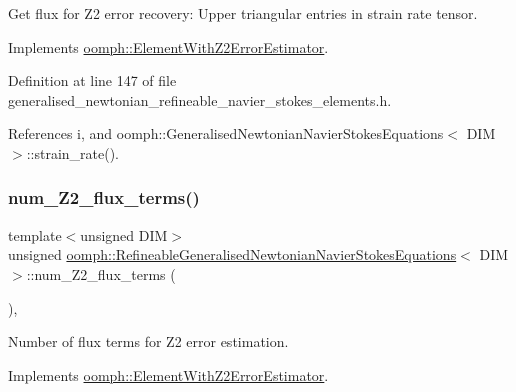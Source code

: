 Get \textquotesingle{}flux\textquotesingle{} for Z2 error recovery\+: Upper triangular entries in strain rate tensor. 



Implements \hyperlink{classoomph_1_1ElementWithZ2ErrorEstimator_a5688ff5f546d81771cabad82ca5a7556}{oomph\+::\+Element\+With\+Z2\+Error\+Estimator}.



Definition at line 147 of file generalised\+\_\+newtonian\+\_\+refineable\+\_\+navier\+\_\+stokes\+\_\+elements.\+h.



References i, and oomph\+::\+Generalised\+Newtonian\+Navier\+Stokes\+Equations$<$ D\+I\+M $>$\+::strain\+\_\+rate().

\mbox{\label{classoomph_1_1RefineableGeneralisedNewtonianNavierStokesEquations_afed7aa29e3771db16a3f57a1eae2dbb2}} 
\subsubsection{\texorpdfstring{num\+\_\+\+Z2\+\_\+flux\+\_\+terms()}{num\_Z2\_flux\_terms()}}
{\footnotesize\ttfamily template$<$unsigned D\+IM$>$ \\
unsigned \hyperlink{classoomph_1_1RefineableGeneralisedNewtonianNavierStokesEquations}{oomph\+::\+Refineable\+Generalised\+Newtonian\+Navier\+Stokes\+Equations}$<$ D\+IM $>$\+::num\+\_\+\+Z2\+\_\+flux\+\_\+terms (\begin{DoxyParamCaption}{ }\end{DoxyParamCaption})\hspace{0.3cm}{\ttfamily [inline]}, {\ttfamily [virtual]}}



Number of \textquotesingle{}flux\textquotesingle{} terms for Z2 error estimation. 



Implements \hyperlink{classoomph_1_1ElementWithZ2ErrorEstimator_ae82c5728902e13da31be19c390fc28e3}{oomph\+::\+Element\+With\+Z2\+Error\+Estimator}.



